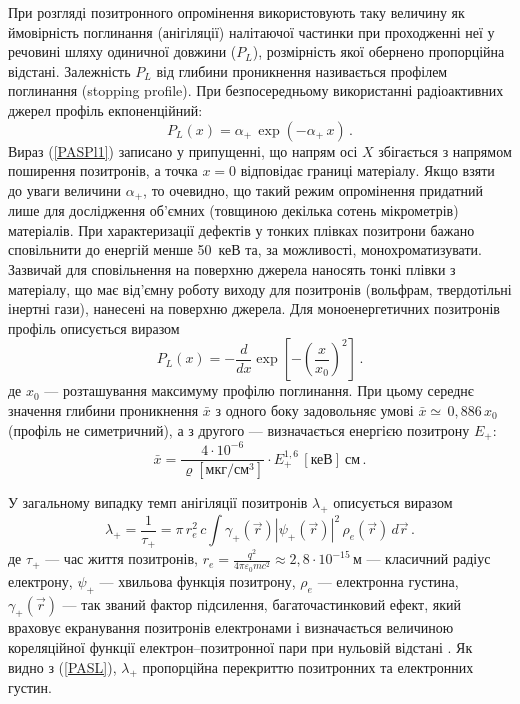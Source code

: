 \documentclass[10pt,a5paper,titlepage,oneside]{book}
\numberwithin{equation}{part}
\begin{document}
При розгляді позитронного опромінення використовують
таку величину як ймовірність поглинання (анігіляції) налітаючої частинки
при проходженні неї у речовині шляху одиничної довжини ($P_L$),
розмірність якої обернено пропорційна відстані.
Залежність $P_L$ від глибини проникнення називається профілем поглинання (stopping profile).
При безпосередньому використанні радіоактивних джерел профіль екпоненційний:
\begin{equation}\label{PASPl1}
P_L(x)=\alpha_+\,\exp(-\alpha_+\,x)\,.
\end{equation}
Вираз (\ref{PASPl1}) записано у припущенні, що
напрям осі $X$ збігається з напрямом поширення позитронів,
а точка $x=0$ відповідає границі матеріалу.
Якщо взяти до уваги величини $\alpha_+$, то очевидно,
що такий режим опромінення придатний лише для дослідження об'ємних
(товщиною декілька сотень мікрометрів) матеріалів.
При характеризації дефектів у тонких плівках позитрони
бажано сповільнити до енергій менше 50~кеВ та, за можливості, монохроматизувати.
Зазвичай для сповільнення на поверхню джерела наносять тонкі плівки з матеріалу, що має
від'ємну роботу виходу для позитронів (вольфрам, твердотільні інертні гази), нанесені на поверхню джерела.
Для моноенергетичних позитронів профіль описується виразом
\begin{equation}\label{PASPl2}
P_L(x)=-\frac{d}{dx}\exp\left[-\left(\frac{x}{x_0}\right)^2\right]\,.
\end{equation}
де
$x_0$ --- розташування максимуму профілю поглинання.
При цьому середнє значення глибини проникнення $\bar{x}$  з одного боку
задовольняє умові $\bar{x}\simeq \,0,886\, x_0$ (профіль не симетричний),
а з другого --- визначається енергією позитрону $E_{+}$:
\begin{equation}
\bar{x}=\frac{4\cdot10^{-6}}{\varrho\left[\text{мкг}/\text{см}^3\right]}\cdot E_{+}^{1,6}\,[\text{кеВ}]\:\text{см}\,.
\end{equation}

У загальному випадку темп анігіляції позитронів $\lambda_+$ описується виразом
\begin{equation}\label{PASL}
\lambda_+=\frac{1}{\tau_+}=\pi\,r_e^2\,c\int\gamma_+(\overrightarrow{r})\left|\psi_+(\overrightarrow{r})\right|^2\,\rho_e(\overrightarrow{r})\,d\overrightarrow{r}\,.
\end{equation}
де
$\tau_+$ --- час життя позитронів,
$r_e=\frac{q^2}{4\pi\varepsilon_0 m c^2}\approx2,8\cdot10^{-15}\,\text{м}$ --- класичний радіус електрону,
$\psi_+$ --- хвильова функція позитрону,
$\rho_e$ --- електронна густина,
$\gamma_+(\overrightarrow{r})$ --- так званий фактор підсилення, багаточастинковий ефект,
який враховує екранування позитронів електронами і визначається величиною
кореляційної функції електрон--позитронної пари при нульовій відстані \cite{tuomisto2019}.
Як видно з (\ref{PASL}), $\lambda_+$ пропорційна перекриттю позитронних та електронних густин.
\end{document}
